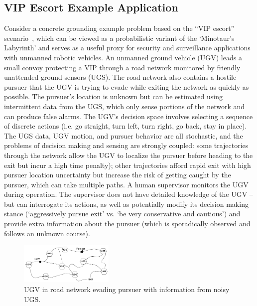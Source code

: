 \subsection{VIP Escort Example Application}
Consider a concrete grounding example problem based on the ``VIP escort'' scenario~\cite{Humphrey2012-lr}, which can be viewed as a probabilistic variant of the `Minotaur's Labyrinth' and serves as a useful proxy for security and surveillance applications with unmanned robotic vehicles. An unmanned ground vehicle (UGV) leads a small convoy protecting a VIP through a road network monitored by friendly unattended ground sensors (UGS). The road network also contains a hostile pursuer that the UGV is trying to evade while exiting the network as quickly as possible. The pursuer's location is unknown but can be estimated using intermittent data from the UGS, which only sense portions of the network and can produce false alarms. The UGV's decision space involves selecting a sequence of discrete actions (i.e. go straight, turn left, turn right, go back, stay in place). The UGS data, UGV motion, and pursuer behavior are all stochastic, and the problems of decision making and sensing are strongly coupled: some trajectories through the network allow the UGV to localize the pursuer before heading to the exit but incur a high time penalty); other trajectories afford rapid exit with high pursuer location uncertainty but increase the risk of getting caught by the pursuer, which can take multiple paths. A human supervisor monitors the UGV during operation. The supervisor does not have detailed knowledge of the UGV -- but can interrogate its actions, as well as potentially modify its decision making stance (`aggressively pursue exit' vs. `be very conservative and cautious') and provide extra information about the pursuer (which is sporadically observed and follows an unknown course). 
    
	\begin{figure}[t]%
    	\centering
     	\includegraphics[width=0.4\textwidth]{Figures/RoadNet}
    	\caption{UGV in road network evading pursuer with information from noisy UGS.} 
        \label{fig:RoadNet}
        \vspace{-0.2 in}
    \end{figure}

